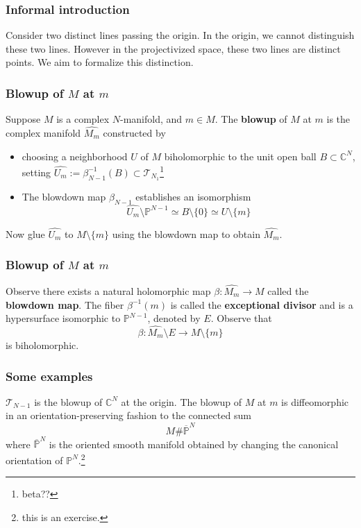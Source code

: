 \documentclass{beamer}
\begin{document}
\begin{frame}
\frametitle{Informal introduction}

Consider two distinct lines passing the origin. In the origin, we cannot distinguish these two lines. However in the projectivized space, these two lines are distinct points. \newline We aim to formalize this distinction.

\end{frame}



\begin{frame}
\frametitle{Blowup of $M$ at $m$}

Suppose $M$ is a complex $N$-manifold, and $m \in M$. The \textbf{blowup} of $M$ at $m$ is the complex manifold $\widehat{M_m}$ constructed by \begin{itemize}
    \item choosing a neighborhood $U$ of $M$ biholomorphic to the unit open ball $B \subset \mathbb{C}^N$, setting $\widehat{U_m} := \beta^{-1}_{N-1}(B) \subset \mathcal{T}_{N_1}$\footnote{beta??}
    \item The blowdown map $\beta_{N-1}$ establishes an isomorphism \[\widehat{U_m}\setminus \mathbb{P}^{N-1} \simeq B \setminus \{0\} \simeq U \setminus \{m\}\]
\end{itemize} Now glue $\widehat{U_m}$ to $M\setminus \{m\}$ using the blowdown map to obtain $\widehat{M_m}$.

\end{frame}


\begin{frame}
\frametitle{Blowup of $M$ at $m$}

Observe there exists a natural holomorphic map $\beta : \widehat{M_m} \to M$ called the \textbf{blowdown map}. The fiber $\beta^{-1}(m)$ is called the \textbf{exceptional divisor} and is a hypersurface isomorphic to $\mathbb{P}^{N-1}$, denoted by $E$. Observe that \[\beta: \widehat{M_m} \setminus E \to M \setminus \{m\}\] is biholomorphic.

\end{frame}


\begin{frame}
\frametitle{Some examples}

$\mathcal{T}_{N-1}$ is the blowup of $\mathbb{C}^N$ at the origin. \newline The blowup of $M$ at $m$ is diffeomorphic in an orientation-preserving fashion to the connected sum \[M\# \overline{\mathbb{P}}^N\] where $\overline{\mathbb{P}}^N$ is the oriented smooth manifold obtained by changing the canonical orientation of $\mathbb{P}^N$.\footnote{this is an exercise.}

\end{frame}
\end{document}
